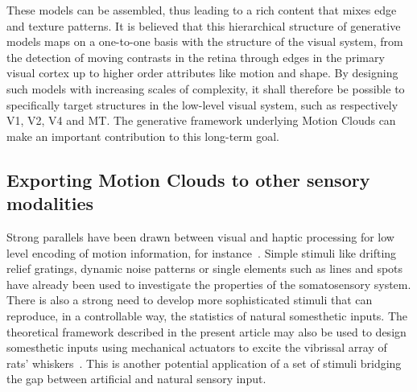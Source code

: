 \documentclass[a4paper,11pt]{article}%
\begin{document}
These models can be assembled, thus leading to a rich content that mixes edge and texture patterns. It is believed that this hierarchical structure of generative models maps on a one-to-one basis with the structure of the visual system, from the detection of moving contrasts in the retina through edges in the primary visual cortex up to higher order attributes like motion and shape.  By designing such models with increasing scales of complexity, it shall therefore be possible to specifically target structures in the low-level visual system, such as respectively V1, V2, V4 and MT. The generative framework underlying Motion Clouds can make an important contribution to this long-term goal. %
%
\subsection{Exporting Motion Clouds to other sensory modalities}
Strong parallels have been drawn between visual and haptic processing for low level encoding of motion information, for instance~\citep{Pei11}. Simple stimuli like drifting relief gratings, dynamic noise patterns or single elements such as lines and spots have already been used to investigate the properties of the somatosensory system. There is also a strong need to develop more sophisticated stimuli that can reproduce, in a controllable way, the statistics of natural somesthetic inputs.  The theoretical framework described in the present article may also be used to design somesthetic inputs using mechanical actuators to excite the vibrissal array of rats' whiskers~\citep{Jacob08}. This is another potential application of a set of stimuli bridging the gap between artificial and natural sensory input. %
%
% 
%
\end{document}
